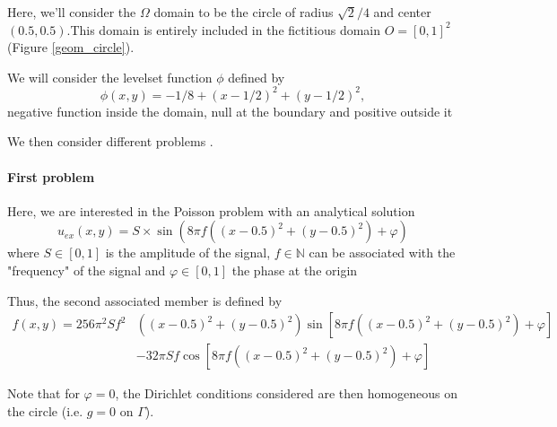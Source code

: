 Here, we'll consider the $\Omega$ domain to be the circle of radius $\sqrt{2}/4$ and center $(0.5,0.5)$.This domain is entirely included in the fictitious domain $O=[0,1]^2$ (Figure \ref{geom_circle}).

We will consider the levelset function $\phi$ defined by
\begin{equation*}
	\phi(x,y)=-1/8+(x-1/2)^2+(y-1/2)^2,
\end{equation*}
negative function inside the domain, null at the boundary and positive outside it
	
We then consider different problems .

\paragraph{First problem} \label{Corr.pb.circle.1}

Here, we are interested in the Poisson problem with an analytical solution
\begin{equation*}
	u_{ex}(x,y)=S\times\sin\left(8\pi f\left((x-0.5)^2+(y-0.5)^2\right)+\varphi\right)
\end{equation*}
where $S\in[0,1]$ is the amplitude of the signal, $f\in\mathbb{N}$ can be associated with the "frequency" of the signal and $\varphi\in[0,1]$ the phase at the origin

Thus, the second associated member is defined by
\begin{align*}
	f(x,y)=256\pi^2 S f^2&\left((x-0.5)^2+(y-0.5)^2\right)\sin\left[8\pi f\left((x-0.5)^2+(y-0.5)^2\right) + \varphi\right] \\
	&- 32\pi S f\cos\left[8\pi f \left((x-0.5)^2+(y-0.5)^2\right) + \varphi\right]
\end{align*}

\begin{Rem}
	Note that for $\varphi=0$, the Dirichlet conditions considered are then homogeneous on the circle (i.e. $g=0$ on $\Gamma$).
\end{Rem}



%

